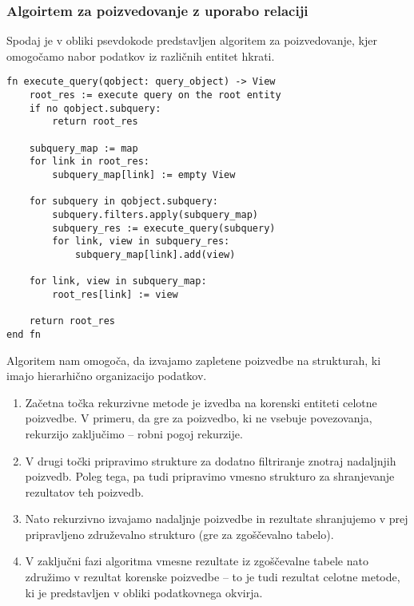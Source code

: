 \documentclass[a4paper,12pt,openright]{book}
\begin{document}
\begin{itemize}
        \newpage
        \subsubsection{Algoirtem za poizvedovanje z uporabo relaciji}

        Spodaj je v obliki psevdokode predstavljen algoritem za poizvedovanje, kjer omogočamo nabor podatkov iz različnih entitet hkrati.

\begin{verbatim}
fn execute_query(qobject: query_object) -> View
    root_res := execute query on the root entity
    if no qobject.subquery:
        return root_res

    subquery_map := map
    for link in root_res:
        subquery_map[link] := empty View

    for subquery in qobject.subquery:
        subquery.filters.apply(subquery_map)
        subquery_res := execute_query(subquery)
        for link, view in subquery_res:
            subquery_map[link].add(view)

    for link, view in subquery_map:
        root_res[link] := view

    return root_res
end fn
\end{verbatim}

        \noindent
        Algoritem nam omogoča, da izvajamo zapletene poizvedbe na strukturah, ki imajo hierarhično organizacijo podatkov. 

        \begin{enumerate}
            \item Začetna točka rekurzivne metode je izvedba na korenski entiteti celotne poizvedbe. V primeru, da gre za poizvedbo, ki ne vsebuje povezovanja, rekurzijo zaključimo – robni pogoj rekurzije.
            \item V drugi točki pripravimo strukture za dodatno filtriranje znotraj nadaljnjih poizvedb. Poleg tega, pa tudi pripravimo vmesno strukturo za shranjevanje rezultatov teh poizvedb.
            \item Nato rekurzivno izvajamo nadaljnje poizvedbe in rezultate shranjujemo v prej pripravljeno združevalno strukturo (gre za zgoščevalno tabelo).
            \item V zaključni fazi algoritma vmesne rezultate iz zgoščevalne tabele nato združimo v rezultat korenske poizvedbe – to je tudi rezultat celotne metode, ki je predstavljen v obliki podatkovnega okvirja.
        \end{enumerate}


\end{itemize}
\end{document}

